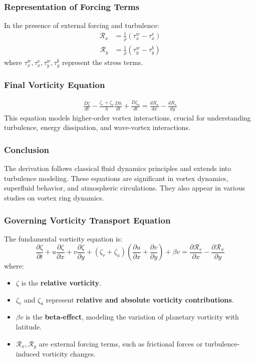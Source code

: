     \subsubsection*{Representation of Forcing Terms}
    In the presence of external forcing and turbulence:
    \begin{align}
        \mathcal{R}_x &= \frac{1}{\rho}(\tau_x^w - \tau_x^v)
    \end{align}
    \begin{align}
        \mathcal{R}_y &= \frac{1}{\rho}(\tau_y^w - \tau_y^b)
    \end{align}
    where $\tau_x^w, \tau_x^v, \tau_y^w, \tau_y^b$ represent the stress terms.

    \subsubsection*{Final Vorticity Equation}
    \begin{align}
        \frac{D \zeta}{d t}-\frac{\zeta_r+\zeta_a}{h} \frac{D h}{d t}+\frac{D \zeta_a}{d t}=\frac{d R_u}{d x}-\frac{d R_x}{d y}
    \end{align}
    This equation models higher-order vortex interactions, crucial for understanding turbulence, energy dissipation, and wave-vortex interactions.

    \subsubsection*{Conclusion}
    The derivation follows classical fluid dynamics principles and extends into turbulence modeling. These equations are significant in vortex dynamics, superfluid behavior, and atmospheric circulations. They also appear in various studies on vortex ring dynamics.

    \subsubsection*{Governing Vorticity Transport Equation}
    The fundamental vorticity equation is:
    \begin{equation*}
        \frac{\partial \zeta}{\partial t} + u \frac{\partial \zeta}{\partial x} + v \frac{\partial \zeta}{\partial y} + \left( \zeta_r + \zeta_a \right) \left( \frac{\partial u}{\partial x} + \frac{\partial v}{\partial y} \right) + \beta v = \frac{\partial \mathcal{R}_v}{\partial x} - \frac{\partial \mathcal{R}_x}{\partial y}
    \end{equation*}
    where:
    \begin{itemize}
        \item $\zeta$ is the \textbf{relative vorticity}.
        \item $\zeta_r$ and $\zeta_a$ represent \textbf{relative and absolute vorticity contributions}.
        \item $\beta v$ is the \textbf{beta-effect}, modeling the variation of planetary vorticity with latitude.
        \item $\mathcal{R}_x, \mathcal{R}_y$ are external forcing terms, such as frictional forces or turbulence-induced vorticity changes.
    \end{itemize}

